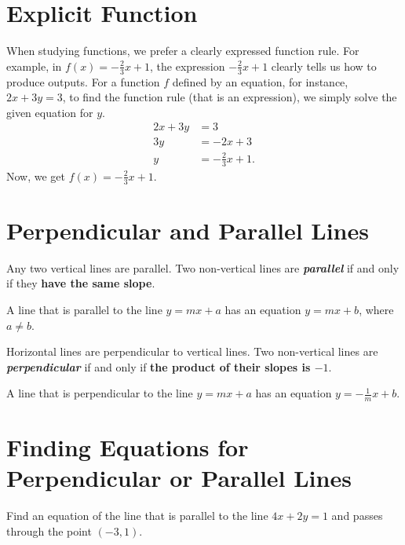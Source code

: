 \documentclass[
  en,11pt]{elegantbook}
\renewenvironment{example}[1][]{
  \refstepcounter{exam}
  \par\noindent\textbf{\color{main}{\examplename} \theexam #1}
  \rmfamily
}{
  \par\ignorespacesafterend
}
\begin{document}
\hypertarget{explicit-function}{%
\section{Explicit Function}\label{explicit-function}}

When studying functions, we prefer a clearly expressed function rule. For example, in \(f(x)=-\frac23x+1\), the expression \(-\frac23x+1\) clearly tells us how to produce outputs. For a function \(f\) defined by an equation, for instance, \(2x+3y=3\), to find the function rule (that is an expression), we simply solve the given equation for \(y\).
\[
\begin{aligned}
2x+3y&=3\\
3y&=-2x+3\\
y&=-\frac23x+1.
\end{aligned}
\]
Now, we get \(f(x)=-\frac23x+1\).

\hypertarget{perpendicular-and-parallel-lines}{%
\section{Perpendicular and Parallel Lines}\label{perpendicular-and-parallel-lines}}

Any two vertical lines are parallel. Two non-vertical lines are \textbf{\emph{parallel}} if and only if they \textbf{have the same slope}.

A line that is parallel to the line \(y=mx+a\) has an equation \(y=mx+b\), where \(a\neq b\).

Horizontal lines are perpendicular to vertical lines. Two non-vertical lines are \textbf{\emph{perpendicular}} if and only if \textbf{the product of their slopes is \(-1\)}.

A line that is perpendicular to the line \(y=mx+a\) has an equation \(y=-\frac1m x+b\).

\hypertarget{finding-equations-for-perpendicular-or-parallel-lines}{%
\section{Finding Equations for Perpendicular or Parallel Lines}\label{finding-equations-for-perpendicular-or-parallel-lines}}

\begin{example}
Find an equation of the line that is parallel to the line \(4x+2y=1\) and passes through the point \((-3, 1)\).
\end{example}
\end{document}
